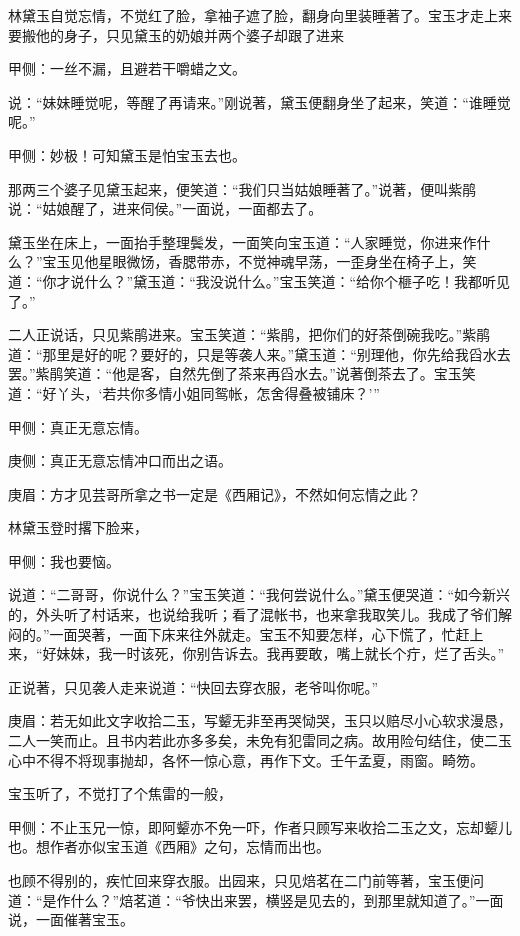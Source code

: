 \begin{parag}
    林黛玉自觉忘情，不觉红了脸，拿袖子遮了脸，翻身向里装睡著了。宝玉才走上来要搬他的身子，只见黛玉的奶娘并两个婆子却跟了进来\begin{note}甲侧：一丝不漏，且避若干嚼蜡之文。\end{note}说：“妹妹睡觉呢，等醒了再请来。”刚说著，黛玉便翻身坐了起来，笑道：“谁睡觉呢。”\begin{note}甲侧：妙极！可知黛玉是怕宝玉去也。\end{note}那两三个婆子见黛玉起来，便笑道：“我们只当姑娘睡著了。”说著，便叫紫鹃说：“姑娘醒了，进来伺侯。”一面说，一面都去了。
\end{parag}


\begin{parag}
    黛玉坐在床上，一面抬手整理鬓发，一面笑向宝玉道：“人家睡觉，你进来作什么？”宝玉见他星眼微饧，香腮带赤，不觉神魂早荡，一歪身坐在椅子上，笑道：“你才说什么？”黛玉道：“我没说什么。”宝玉笑道：“给你个榧子吃！我都听见了。”
\end{parag}


\begin{parag}
    二人正说话，只见紫鹃进来。宝玉笑道：“紫鹃，把你们的好茶倒碗我吃。”紫鹃道：“那里是好的呢？要好的，只是等袭人来。”黛玉道：“别理他，你先给我舀水去罢。”紫鹃笑道：“他是客，自然先倒了茶来再舀水去。”说著倒茶去了。宝玉笑道：“好丫头，‘若共你多情小姐同鸳帐，怎舍得叠被铺床？’”\begin{note}甲侧：真正无意忘情。\end{note}\begin{note}庚侧：真正无意忘情冲口而出之语。\end{note}\begin{note}庚眉：方才见芸哥所拿之书一定是《西厢记》，不然如何忘情之此？\end{note}林黛玉登时撂下脸来，\begin{note}甲侧：我也要恼。\end{note}说道：“二哥哥，你说什么？”宝玉笑道：“我何尝说什么。”黛玉便哭道：“如今新兴的，外头听了村话来，也说给我听；看了混帐书，也来拿我取笑儿。我成了爷们解闷的。”一面哭著，一面下床来往外就走。宝玉不知要怎样，心下慌了，忙赶上来，“好妹妹，我一时该死，你别告诉去。我再要敢，嘴上就长个疔，烂了舌头。”
\end{parag}


\begin{parag}
    正说著，只见袭人走来说道：“快回去穿衣服，老爷叫你呢。”\begin{note}庚眉：若无如此文字收拾二玉，写颦无非至再哭恸哭，玉只以赔尽小心软求漫恳，二人一笑而止。且书内若此亦多多矣，未免有犯雷同之病。故用险句结住，使二玉心中不得不将现事抛却，各怀一惊心意，再作下文。壬午孟夏，雨窗。畸笏。\end{note}宝玉听了，不觉打了个焦雷的一般，\begin{note}甲侧：不止玉兄一惊，即阿颦亦不免一吓，作者只顾写来收拾二玉之文，忘却颦儿也。想作者亦似宝玉道《西厢》之句，忘情而出也。\end{note}也顾不得别的，疾忙回来穿衣服。出园来，只见焙茗在二门前等著，宝玉便问道：“是作什么？”焙茗道：“爷快出来罢，横竖是见去的，到那里就知道了。”一面说，一面催著宝玉。
\end{parag}


